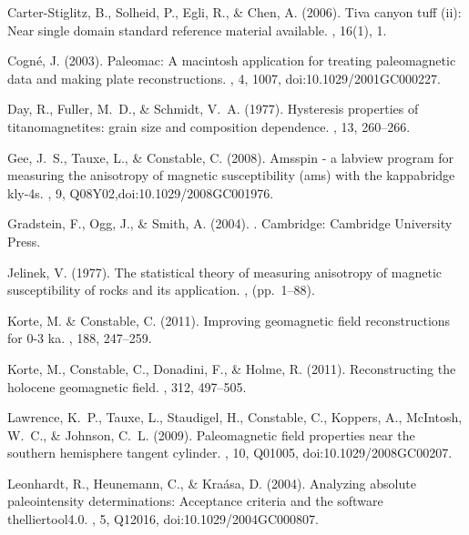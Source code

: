 \documentclass[11pt]{book}
\begin{document}
{{{{\begin{thebibliography}{}
Carter-Stiglitz, B., Solheid, P., Egli, R., \& Chen, A. (2006).
\newblock Tiva canyon tuff (ii): Near single domain standard reference material
  available.
, 16(1), 1.

Cogn\'e, J. (2003).
\newblock Paleomac: A macintosh application for treating paleomagnetic data and
  making plate reconstructions.
, 4, 1007, doi:10.1029/2001GC000227.

Day, R., Fuller, M.~D., \& Schmidt, V.~A. (1977).
\newblock Hysteresis properties of titanomagnetites: grain size and composition
  dependence.
, 13, 260--266.

Gee, J.~S., Tauxe, L., \& Constable, C. (2008).
\newblock Amsspin - a labview program for measuring the anisotropy of magnetic
  susceptibility (ams) with the kappabridge kly-4s.
, 9, Q08Y02,doi:10.1029/2008GC001976.

Gradstein, F., Ogg, J., \& Smith, A. (2004).
.
\newblock Cambridge: Cambridge University Press.

Jelinek, V. (1977).
\newblock The statistical theory of measuring anisotropy of magnetic
  susceptibility of rocks and its application.
, (pp.\ 1--88).

Korte, M. \& Constable, C. (2011).
\newblock Improving geomagnetic field reconstructions for 0-3 ka.
, 188, 247--259.

Korte, M., Constable, C., Donadini, F., \& Holme, R. (2011).
\newblock Reconstructing the holocene geomagnetic field.
, 312, 497--505.

Lawrence, K.~P., Tauxe, L., Staudigel, H., Constable, C., Koppers, A.,
  McIntosh, W.~C., \& Johnson, C.~L. (2009).
\newblock Paleomagnetic field properties near the southern hemisphere tangent
  cylinder.
, 10, Q01005,
  doi:10.1029/2008GC00207.

Leonhardt, R., Heunemann, C., \& Kra\'asa, D. (2004).
\newblock Analyzing absolute paleointensity determinations: Acceptance criteria
  and the software thelliertool4.0.
, 5, Q12016, doi:10.1029/2004GC000807.


\end{thebibliography}}}}}
\end{document}

